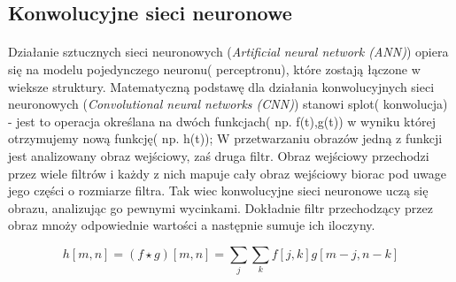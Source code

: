 \documentclass[a4paper,12pt]{article}
\begin{document}
    \subsection{Konwolucyjne sieci neuronowe}
        \paragraph{\noindent} Działanie sztucznych sieci neuronowych                        (\textit{Artificial neural network (ANN)}) opiera się na modelu pojedynczego     neuronu( perceptronu), które zostają łączone w wieksze struktury.
            Matematyczną podstawę dla działania konwolucyjnych sieci neuronowych (\textit{Convolutional neural networks (CNN)}) stanowi splot( konwolucja) - 
            jest to operacja określana na dwóch funkcjach( np. f(t),g(t)) w wyniku której otrzymujemy nową funkcję( np. h(t)); 
            W przetwarzaniu obrazów jedną z funkcji jest analizowany obraz wejściowy,
            zaś druga filtr.
            Obraz wejściowy przechodzi przez wiele filtrów i każdy z nich mapuje cały obraz wejściowy biorac pod uwage jego części o rozmiarze filtra. Tak wiec konwolucyjne sieci neuronowe uczą się obrazu, analizując go pewnymi wycinkami. Dokładnie filtr przechodzący przez obraz mnoży odpowiednie wartości a następnie sumuje ich iloczyny.
        
            \begin{displaymath}
                h[m, n] = ( f \star g)[m, n] = \sum\limits_{j}\sum\limits_{k}f[j, k]g[m-j, n-k]
            \end{displaymath}
		
\end{document}
